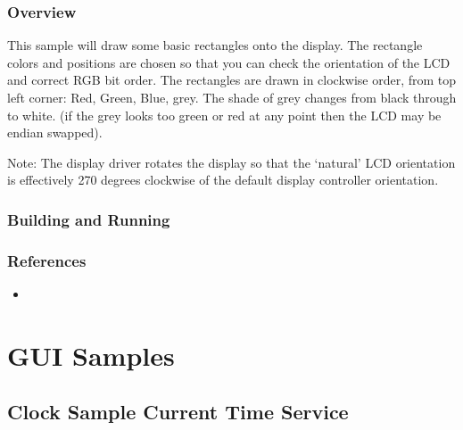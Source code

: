 \documentclass[letterpaper,10pt,english]{sphinxmanual}
\begin{document}
\subsubsection{Overview}
\label{\detokenize{samples/display/st7789v/README:overview}}
This sample will draw some basic rectangles onto the display.
The rectangle colors and positions are chosen so that you can check the
orientation of the LCD and correct RGB bit order. The rectangles are drawn
in clockwise order, from top left corner: Red, Green, Blue, grey. The shade of
grey changes from black through to white. (if the grey looks too green or red
at any point then the LCD may be endian swapped).

Note: The display driver rotates the display so that the ‘natural’ LCD
orientation is effectively 270 degrees clockwise of the default display
controller orientation.


\subsubsection{Building and Running}
\label{\detokenize{samples/display/st7789v/README:building-and-running}}

\subsubsection{References}
\label{\detokenize{samples/display/st7789v/README:references}}\begin{itemize}
\item {} 

\end{itemize}


\section{GUI Samples}
\label{\detokenize{samples/gui/gui:gui-samples}}\label{\detokenize{samples/gui/gui:id1}}\label{\detokenize{samples/gui/gui::doc}}

\subsection{Clock Sample Current Time Service}
\label{\detokenize{samples/gui/clock-cts-rtc2/README:clock-sample-current-time-service}}\label{\detokenize{samples/gui/clock-cts-rtc2/README:clock-sample-cts}}\label{\detokenize{samples/gui/clock-cts-rtc2/README::doc}}
\end{document}
